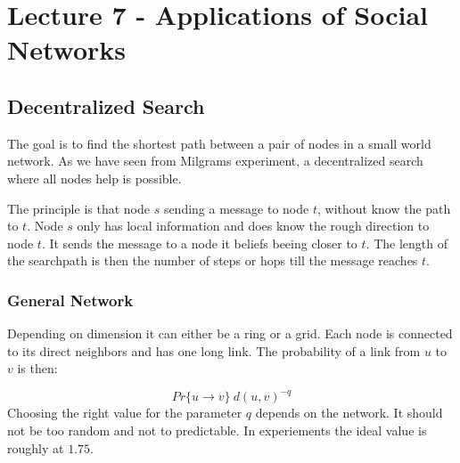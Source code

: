 \section{Lecture 7 - Applications of Social Networks} %
\label{sec:lecture_7_applications_of_social_networks}

\subsection{Decentralized Search} %
\label{sub:decentralized_search}
The goal is to find the shortest path between a pair of nodes in a small world network.
As we have seen from Milgrams experiment,
a decentralized search where all nodes help is possible.

The principle is that node $s$ sending a message to node $t$,
without know the path to $t$.
Node $s$ only has local information
and does know the rough direction to node $t$.
It sends the message to a node it beliefs beeing closer to $t$.
The length of the searchpath is then the number of steps or hops till the message reaches $t$.

\subsubsection{General Network} %
\label{ssub:general_network}
	Depending on dimension it can either be a  ring or a grid.
	Each node is connected to its direct neighbors
	and has one long link.
	The probability of a link from $u$ to $v$ is then:
	
	\begin{equation}
		Pr\{u \rightarrow v\} ~ d(u, v)^{-q}
	\end{equation}
	Choosing the right value for the parameter $q$ depends on the network.
	It should not be too random and not to predictable.
	In experiements the ideal value is roughly at $1.75$.

